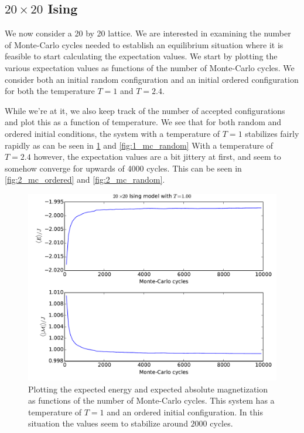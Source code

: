 \subsection{$20\times20$ Ising}
\label{sub:_20times20_ising}

We now consider a 20 by 20 lattice. We are interested in examining the number
of Monte-Carlo cycles needed to establish an equilibrium situation where it is
feasible to start calculating the expectation values. We start by plotting the
various expectation values as functions of the number of Monte-Carlo cycles.
We consider both an initial random configuration and an initial ordered
configuration for both the temperature $T = 1$ and $T = 2.4$.

While we're at it, we also keep track of the number of accepted configurations
and plot this as a function of temperature.
We see that for both random and ordered initial conditions, the system with a
temperature of $T = 1$ stabilizes fairly rapidly as can be seen in
\cref{fig:1_mc_ordered} and \cref{fig:1_mc_random} With a temperature of $T =
2.4$ however, the expectation values are a bit jittery at first, and seem to
somehow converge for upwards of 4000 cycles. This can be seen in
\cref{fig:2_mc_ordered} and \cref{fig:2_mc_random}.
\begin{figure}
  \centering
  \includegraphics[width=0.8\linewidth]{1_mc_ordered.pdf}
  \caption{Plotting the expected energy and expected absolute magnetization as
  functions of the number of Monte-Carlo cycles. This system has a temperature
of $T = 1$ and an ordered initial configuration. In this situation the values
seem to stabilize around $2000$ cycles.}
  \label{fig:1_mc_ordered}
\end{figure}
